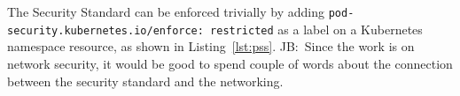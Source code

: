 \documentclass[english, 12pt, a4paper, sci, utf8, a-2b, online]{aaltothesis}
\newcommand{\mycomment}[3]{\textcolor{#1}{#2:~#3}}
\newcommand{\jb}[1]{\noindent\mycomment{aaltoRed}{JB}{#1}}
\begin{document}


The Security Standard can be enforced trivially by adding \texttt{pod-security.kubernetes.io/enforce: restricted} as a label on a Kubernetes namespace resource, as shown in Listing~\ref{lst:pss}. \jb{Since the work is on network security, it would be good to spend couple of words about the connection between the security standard and the networking.}



\end{document}
